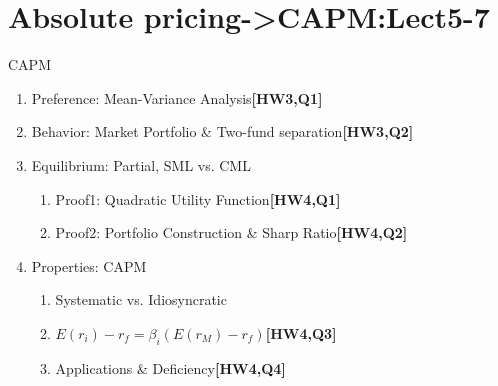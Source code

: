 \documentclass{beamer}
\begin{document}
\section{Absolute pricing->CAPM:Lect5-7}
  \label{sec:PE-Model}
    \begin{frame}{CAPM}
    \begin{enumerate}
    	\item Preference: Mean-Variance Analysis\textbf{[HW3,Q1]}
    	\item Behavior: Market Portfolio \& Two-fund separation\textbf{[HW3,Q2]}
		\item Equilibrium: Partial, SML vs. CML
			\begin{enumerate}
				\item Proof1: Quadratic Utility Function\textbf{[HW4,Q1]}
				\item Proof2: Portfolio Construction \& Sharp Ratio\textbf{[HW4,Q2]}
			\end{enumerate}
    	\item Properties: CAPM
    		\begin{enumerate}
    			\item Systematic vs. Idiosyncratic
				\item $E(r_i)-r_f=\beta_i(E(r_M)-r_f)$\textbf{[HW4,Q3]}
				\item Applications \& Deficiency\textbf{[HW4,Q4]}
    		\end{enumerate}
    \end{enumerate}
	\end{frame}

\end{document}
